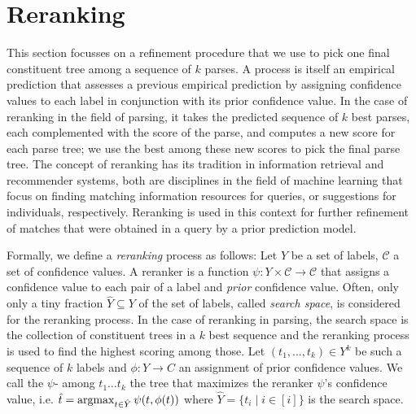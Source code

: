 \documentclass[../../document.tex]{subfiles}
\begin{document}
    \section{Reranking}
    This section focusses on a refinement procedure that we use to pick one final constituent tree among a sequence of \(k\) parses.
    A  process is itself an empirical prediction that assesses a previous empirical prediction by assigning confidence values to each label in conjunction with its prior confidence value.
    In the case of reranking in the field of parsing, it takes the predicted sequence of \(k\) best parses, each complemented with the score of the parse, and computes a new score for each parse tree; we use the best among these new scores to pick the final parse tree.
    The concept of reranking has its tradition in information retrieval and recommender systems, both are disciplines in the field of machine learning that focus on finding matching information resources for queries, or suggestions for individuals, respectively.
    Reranking is used in this context for further refinement of matches that were obtained in a query by a prior prediction model. \citep{carbonell1998use,adomavicius2009toward}
    
    Formally, we define a \emph{reranking} process as follows:
        Let \(Y\) be a set of labels, \(\mathcal{C}\) a set of confidence values.
        A reranker is a function \(\psi \colon Y \times \mathcal{C} \to \mathcal{C}\) that assigns a confidence value to each pair of a label and \emph{prior} confidence value.
    Often, only only a tiny fraction \(\hat{Y} \subseteq Y\) of the set of labels, called \emph{search space}, is considered for the reranking process.
    In the case of reranking in parsing, the search space is the collection of constituent trees in a \(k\) best sequence and the reranking process is used to find the highest scoring among those.
    Let \((t_1, \ldots, t_k) \in Y^k\) be such a sequence of \(k\) labels and \(\phi \colon Y \to C\) an assignment of prior confidence values.
    We call the \(\psi\)- among \(t_1 \ldots t_k\) the tree that maximizes the reranker \(\psi\)'s confidence value, i.e. \(
        \hat{t} = \operatorname{arg max}_{t \in \hat{Y}} \psi(t, \phi(t))
    \) where \(\hat{Y} = \{t_i \mid i \in [i]\}\) is the search space.
    
\end{document}
